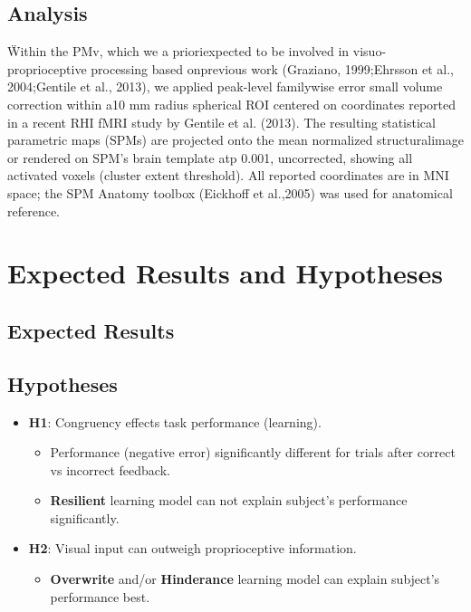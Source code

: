 \documentclass[man]{apa7}
\begin{document}
\subsection{Analysis}

\"Within the PMv, which we a prioriexpected to be involved in visuo-proprioceptive processing based onprevious work (Graziano, 1999;Ehrsson et al., 2004;Gentile et al., 2013), we applied peak-level familywise error small volume correction within a10 mm radius spherical ROI centered on coordinates reported in a recent RHI fMRI study by Gentile et al. (2013). The resulting statistical parametric maps (SPMs) are projected onto the mean normalized structuralimage or rendered on SPM’s brain template atp 0.001, uncorrected, showing all activated voxels (cluster extent threshold). All reported coordinates are in MNI space; the SPM Anatomy toolbox (Eickhoff et al.,2005) was used for anatomical reference.\"

\parencite{Limanowski2016}

\section{Expected Results and Hypotheses}

\subsection{Expected Results}

\subsection{Hypotheses}

    \begin{itemize}
        \item \textbf{H1}: Congruency effects task performance (learning).
        \begin{itemize}
            \item Performance (negative error) significantly different for trials after correct vs incorrect feedback.
            \item \textbf{Resilient} learning model can not explain subject's performance significantly.
        \end{itemize}
        \item \textbf{H2}: Visual input can outweigh proprioceptive information.
        \begin{itemize}
            \item \textbf{Overwrite} and/or \textbf{Hinderance} learning model can explain subject's performance best.
        \end{itemize}
    \end{itemize}
\end{document}

